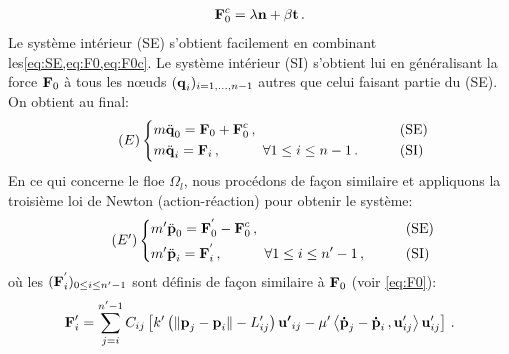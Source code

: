 \begin{align}  \label{eq:F0c}
    \bm{\mathrm{F}}_0^c = \lambda \bm{\mathrm{n}} + \beta \bm{\mathrm{t}} \,.
\end{align}
Le système intérieur (SE) s'obtient facilement en combinant les\cref{eq:SE,eq:F0,eq:F0c}. Le système intérieur (SI) s'obtient lui en généralisant la force $\bm{\mathrm{F}}_0$ à tous les n\oe{}uds $(\bm{\mathrm{q}}_i)_{i=1,\ldots,n-1}$ autres que celui faisant partie du (SE). On obtient au final:
\begin{align} \tag{$E$} \label{eq:e}
\begin{dcases}
    m \ddot{\bm{\mathrm{q}}}_0 = \bm{\mathrm{F}}_0 + \bm{\mathrm{F}}^c_0  \,, &\qquad \text{(SE)} \\
    m \ddot{\bm{\mathrm{q}}}_i = \bm{\mathrm{F}}_i   \,, \quad \quad \quad \forall 1 \leq i \leq n-1 \,. &\qquad \text{(SI)}
\end{dcases}
\end{align}
En ce qui concerne le floe $\Omega_l$, nous procédons de façon similaire et appliquons la troisième loi de Newton (action-réaction) pour obtenir le système:
\begin{align} \tag{$E'$} \label{eq:eprime}
\begin{dcases}
    m' \ddot{\bm{\mathrm{p}}}_0 = \bm{\mathrm{F}}^{'}_0 - \bm{\mathrm{F}}^c_0  \,, &\qquad \text{(SE)} \\
    m' \ddot{\bm{\mathrm{p}}}_i = \bm{\mathrm{F}}^{'}_i   \,, \quad \quad \quad \forall 1 \leq i \leq n'-1 \,, &\qquad \text{(SI)}
\end{dcases}
\end{align}
où les $(\bm{\mathrm{F}}^{'}_i)_{0 \leq i \leq n'-1}$ sont définis de façon similaire à $\bm{\mathrm{F}}_0$ (voir \cref{eq:F0}):
\begin{align}
    \bm{\mathrm{F}}'_i = \sum_{j=i}^{n'-1}C_{ij} \left[ k' \left( \Vert \bm{\mathrm{p}}_j - \bm{\mathrm{p}}_i \Vert - L'_{ij} \right) \bm{\mathrm{u'}}_{ij} - \mu' \left\langle \bm{\mathrm{\dot{p}}}_j - \bm{\mathrm{\dot{p}}}_i\,, \bm{\mathrm{u}}'_{ij}  \right\rangle  \bm{\mathrm{u}}'_{ij}  \right] \,.
\end{align}

